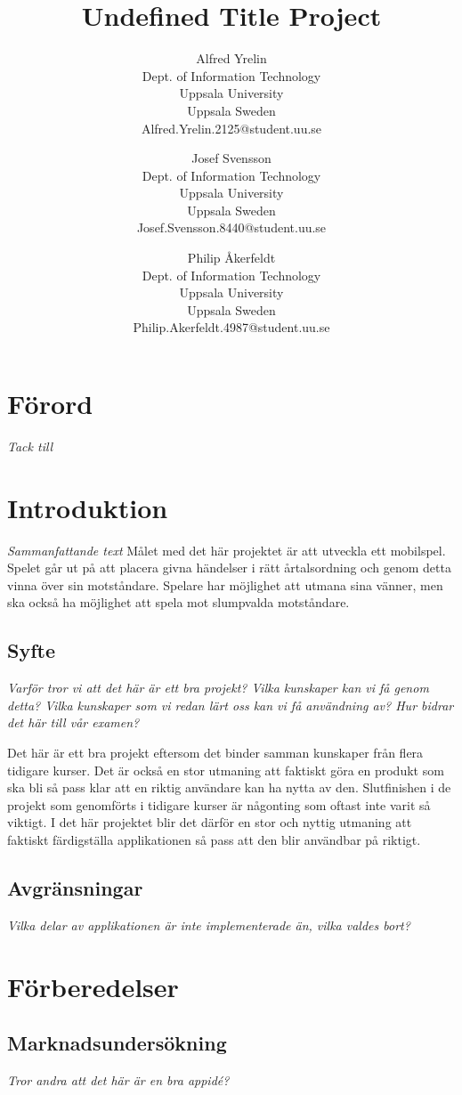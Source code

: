 \documentclass[11pt,a4paper]{article}
\author{
Alfred Yrelin \\
\textup{Dept. of Information Technology}\\
\textup{Uppsala University}\\
\textup{Uppsala Sweden}\\
\textup{Alfred.Yrelin.2125@student.uu.se}
\and 
Josef Svensson \\
\textup{Dept. of Information Technology}\\
\textup{Uppsala University}\\
\textup{Uppsala Sweden}\\
\textup{Josef.Svensson.8440@student.uu.se}
\and
Philip Åkerfeldt \\
\textup{Dept. of Information Technology}\\
\textup{Uppsala University}\\
\textup{Uppsala Sweden}\\
\textup{Philip.Akerfeldt.4987@student.uu.se}
}
\title{Undefined Title Project}
\begin{document}
\maketitle

\newpage
\section{Förord}
\textit{Tack till}
\newpage

\tableofcontents
\newpage

\section{Introduktion}
\textit{Sammanfattande text}
Målet med det här projektet är att utveckla ett mobilspel. Spelet går ut på att placera givna händelser i rätt årtalsordning och genom detta vinna över sin motståndare. Spelare har möjlighet att utmana sina vänner, men ska också ha möjlighet att spela mot slumpvalda motståndare. 

\subsection{Syfte}
\textit{Varför tror vi att det här är ett bra projekt?
Vilka kunskaper kan vi få genom detta?
Vilka kunskaper som vi redan lärt oss kan vi få användning av?
Hur bidrar det här till vår examen?}


Det här är ett bra projekt eftersom det binder samman kunskaper från flera tidigare kurser. Det är också en stor utmaning att faktiskt göra en produkt som ska bli så pass klar att en riktig användare kan ha nytta av den. Slutfinishen i de projekt som genomförts i tidigare kurser är någonting som oftast inte varit så viktigt. I det här projektet blir det därför en stor och nyttig utmaning att faktiskt färdigställa applikationen så pass att den blir användbar på riktigt. 


\subsection{Avgränsningar}
\textit{Vilka delar av applikationen är inte implementerade än, vilka valdes bort?}


\section{Förberedelser}

\subsection{Marknadsundersökning}
\textit{Tror andra att det här är en bra appidé?}
\end{document}
